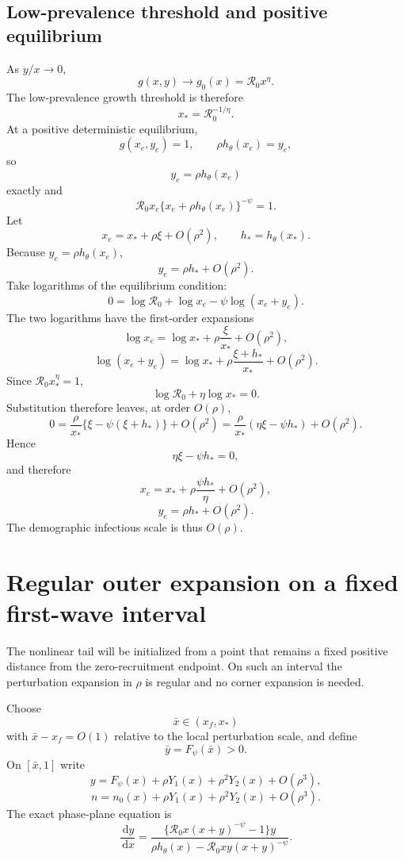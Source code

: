 \documentclass[11pt]{article}
\newcommand{\Rzero}{\mathcal R_0}
\newcommand{\hth}{h_\theta}
\newcommand{\Fpsi}{F_\psi}
\newcommand{\xf}{x_f}
\newcommand{\xs}{x_*}
\newcommand{\dd}{\,\mathrm{d}}
\newcommand{\gh}{g_0}
\begin{document}
\subsection{Low-prevalence threshold and positive equilibrium}
As $y/x\to0$,
\[
g(x,y)\to\gh(x)=\Rzero x^\eta.
\]
The low-prevalence growth threshold is therefore
\[
\boxed{\xs=\Rzero^{-1/\eta}.}
\]
At a positive deterministic equilibrium,
\[
g(x_e,y_e)=1,
\qquad
\rho\hth(x_e)=y_e,
\]
so
\[
y_e=\rho\hth(x_e)
\]
exactly and
\[
\Rzero x_e\{x_e+\rho\hth(x_e)\}^{-\psi}=1.
\]
Let
\[
x_e=\xs+\rho\xi+O(\rho^2),
\qquad
h_*=\hth(\xs).
\]
Because $y_e=\rho\hth(x_e)$,
\[
y_e=\rho h_*+O(\rho^2).
\]
Take logarithms of the equilibrium condition:
\[
0=\log\Rzero+\log x_e-\psi\log(x_e+y_e).
\]
The two logarithms have the first-order expansions
\[
\log x_e
=\log\xs+\rho\frac{\xi}{\xs}+O(\rho^2),
\]
\[
\log(x_e+y_e)
=\log\xs+\rho\frac{\xi+h_*}{\xs}+O(\rho^2).
\]
Since $\Rzero\xs^\eta=1$,
\[
\log\Rzero+\eta\log\xs=0.
\]
Substitution therefore leaves, at order $O(\rho)$,
\[
0=\frac{\rho}{\xs}\{\xi-\psi(\xi+h_*)\}+O(\rho^2)
=\frac{\rho}{\xs}(\eta\xi-\psi h_*)+O(\rho^2).
\]
Hence
\[
\boxed{\eta\xi-\psi h_*=0,}
\]
and therefore
\[
\boxed{
x_e=\xs+\rho\frac{\psi h_*}{\eta}+O(\rho^2),}
\]
\[
\boxed{
y_e=\rho h_*+O(\rho^2).}
\]
The demographic infectious scale is thus $O(\rho)$.

\section{Regular outer expansion on a fixed first-wave interval}
\label{sec:outer}

The nonlinear tail will be initialized from a point that remains a fixed positive distance from the zero-recruitment endpoint. On such an interval the perturbation expansion in $\rho$ is regular and no corner expansion is needed.

Choose
\[
\bar x\in(\xf,\xs)
\]
with $\bar x-\xf=O(1)$ relative to the local perturbation scale, and define
\[
\bar y=\Fpsi(\bar x)>0.
\]
On $[\bar x,1]$ write
\[
y=\Fpsi(x)+\rho Y_1(x)+\rho^2Y_2(x)+O(\rho^3),
\]
\[
n=n_0(x)+\rho Y_1(x)+\rho^2Y_2(x)+O(\rho^3).
\]
The exact phase-plane equation is
\[
\frac{\dd y}{\dd x}
=
\frac{\{\Rzero x(x+y)^{-\psi}-1\}y}
{\rho\hth(x)-\Rzero xy(x+y)^{-\psi}}.
\]
\end{document}
